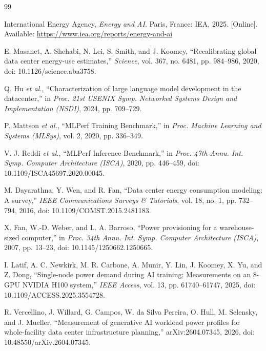 \documentclass[final,3p,12pt,nopreprintline]{elsarticle}
\begin{document}
\begin{thebibliography}{99}

\label{ref:1}
International Energy Agency, \emph{Energy and AI}. Paris, France: IEA, 2025. [Online]. Available: \url{https://www.iea.org/reports/energy-and-ai}

\label{ref:2}
E. Masanet, A. Shehabi, N. Lei, S. Smith, and J. Koomey, ``Recalibrating global data center energy-use estimates,'' \emph{Science}, vol. 367, no. 6481, pp. 984--986, 2020, doi: 10.1126/science.aba3758.

\label{ref:3}
Q. Hu \emph{et al.}, ``Characterization of large language model development in the datacenter,'' in \emph{Proc. 21st USENIX Symp. Networked Systems Design and Implementation (NSDI)}, 2024, pp. 709--729.

\label{ref:4}
P. Mattson \emph{et al.}, ``MLPerf Training Benchmark,'' in \emph{Proc. Machine Learning and Systems (MLSys)}, vol. 2, 2020, pp. 336--349.

\label{ref:5}
V. J. Reddi \emph{et al.}, ``MLPerf Inference Benchmark,'' in \emph{Proc. 47th Annu. Int. Symp. Computer Architecture (ISCA)}, 2020, pp. 446--459, doi: 10.1109/ISCA45697.2020.00045.

\label{ref:6}
M. Dayarathna, Y. Wen, and R. Fan, ``Data center energy consumption modeling: A survey,'' \emph{IEEE Communications Surveys \& Tutorials}, vol. 18, no. 1, pp. 732--794, 2016, doi: 10.1109/COMST.2015.2481183.

\label{ref:7}
X. Fan, W.-D. Weber, and L. A. Barroso, ``Power provisioning for a warehouse-sized computer,'' in \emph{Proc. 34th Annu. Int. Symp. Computer Architecture (ISCA)}, 2007, pp. 13--23, doi: 10.1145/1250662.1250665.

\label{ref:8}
I. Latif, A. C. Newkirk, M. R. Carbone, A. Munir, Y. Lin, J. Koomey, X. Yu, and Z. Dong, ``Single-node power demand during AI training: Measurements on an 8-GPU NVIDIA H100 system,'' \emph{IEEE Access}, vol. 13, pp. 61740--61747, 2025, doi: 10.1109/ACCESS.2025.3554728.

\label{ref:9}
R. Vercellino, J. Willard, G. Campos, W. da Silva Pereira, O. Hull, M. Selensky, and J. Mueller, ``Measurement of generative AI workload power profiles for whole-facility data center infrastructure planning,'' arXiv:2604.07345, 2026, doi: 10.48550/arXiv.2604.07345.


\end{thebibliography}
\end{document}
